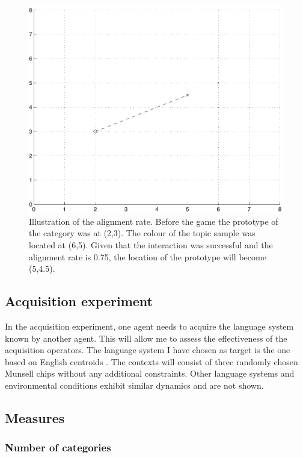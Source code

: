 \begin{figure}[htbp]
  \begin{center}
    \includegraphics[width=.55\textwidth]{./basic-operators/figures/alignment-rate.pdf}
    \caption[Illustration of the alignment rate]{Illustration of the
      alignment rate. Before the game the prototype of the category
      was at (2,3). The colour of the topic sample was located at
      (6,5). Given that the interaction was successful and the
      alignment rate is 0.75, the location of the prototype will
      become (5,4.5).}
    \label{f:alignment-rate}
  \end{center}
\end{figure}

\subsection{Acquisition experiment}

In the acquisition experiment, one agent needs to acquire the language
system known by another agent. This will allow me to assess the
effectiveness of the acquisition operators. The language system I have
chosen as target is the one based on English centroids
\citep{sturges95location}. The contexts will consist of three randomly
chosen Munsell chips \citep{newhall42final} without any additional
constraints. Other language systems and environmental conditions
exhibit similar dynamics and are not shown.

\subsection{Measures}

\subsubsection{Number of categories}


